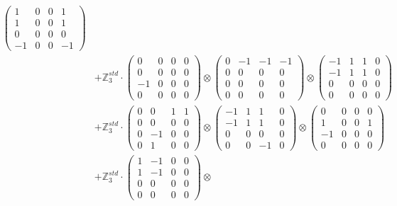 \documentclass{article}
\begin{document}
{\begin{align}
            \begin{pmatrix} 1 & 0 & 0 & 1 \\ 1 & 0 & 0 & 1 \\ 0 & 0 & 0 & 0 \\ -1 & 0 & 0 & -1 \end{pmatrix} \\ 
        &+ \label{Rs16-Rc11-Solution-26-c25} \mathbb{Z}_3^{std} \cdot 
            \begin{pmatrix} 0 & 0 & 0 & 0 \\ 0 & 0 & 0 & 0 \\ -1 & 0 & 0 & 0 \\ 0 & 0 & 0 & 0 \end{pmatrix} \otimes 
            \begin{pmatrix} 0 & -1 & -1 & -1 \\ 0 & 0 & 0 & 0 \\ 0 & 0 & 0 & 0 \\ 0 & 0 & 0 & 0 \end{pmatrix} \otimes 
            \begin{pmatrix} -1 & 1 & 1 & 0 \\ -1 & 1 & 1 & 0 \\ 0 & 0 & 0 & 0 \\ 0 & 0 & 0 & 0 \end{pmatrix} \\ 
        &+ \label{Rs16-Rc11-Solution-26-c26} \mathbb{Z}_3^{std} \cdot 
            \begin{pmatrix} 0 & 0 & 1 & 1 \\ 0 & 0 & 0 & 0 \\ 0 & -1 & 0 & 0 \\ 0 & 1 & 0 & 0 \end{pmatrix} \otimes 
            \begin{pmatrix} -1 & 1 & 1 & 0 \\ -1 & 1 & 1 & 0 \\ 0 & 0 & 0 & 0 \\ 0 & 0 & -1 & 0 \end{pmatrix} \otimes 
            \begin{pmatrix} 0 & 0 & 0 & 0 \\ 1 & 0 & 0 & 1 \\ -1 & 0 & 0 & 0 \\ 0 & 0 & 0 & 0 \end{pmatrix} \\ 
        &+ \label{Rs16-Rc11-Solution-26-c27} \mathbb{Z}_3^{std} \cdot 
            \begin{pmatrix} 1 & -1 & 0 & 0 \\ 1 & -1 & 0 & 0 \\ 0 & 0 & 0 & 0 \\ 0 & 0 & 0 & 0 \end{pmatrix} \otimes 

\end{align}}
\end{document}

